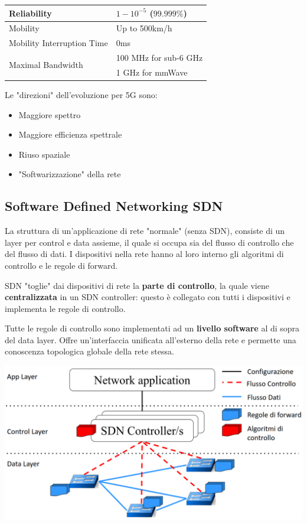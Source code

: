 \begin{center}
{\begin{tabular}{l | l}
			Reliability & $1-10^{-5}$ ($99.999\%$) \\
			\hline
			
			Mobility & Up to 500km/h \\
			\hline
			
			Mobility Interruption Time & 0ms \\
			\hline
			
			\multirow{2}{*}{Maximal Bandwidth} & 100 MHz for sub-6 GHz \\
			\cline{2-2}
			& 1 GHz for mmWave \\
			\hline
	\end{tabular}}
\end{center}

Le "direzioni" dell'evoluzione per 5G sono: 
\begin{itemize}
	\item Maggiore spettro
	\item Maggiore efficienza spettrale
	\item Riuso spaziale
	\item "Softwarizzazione" della rete
\end{itemize}


\subsection{Software Defined Networking SDN}

La struttura di un'applicazione di rete "normale" (senza SDN), consiste di un layer per control e data assieme, il quale si occupa sia del flusso di controllo che del flusso di dati. I dispositivi nella rete hanno al loro interno gli algoritmi di controllo e le regole di forward. 

SDN "toglie" dai dispositivi di rete la \textbf{parte di controllo}, la quale viene \textbf{centralizzata} in un SDN controller: questo è collegato con tutti i dispositivi e implementa le regole di controllo. 

Tutte le regole di controllo sono implementati ad un \textbf{livello software} al di sopra del data layer. Offre un'interfaccia unificata all'esterno della rete e permette una conoscenza topologica globale della rete stessa.

\begin{center}
	\includegraphics[width=0.8\linewidth]{img/5g/sdn1}
\end{center}

